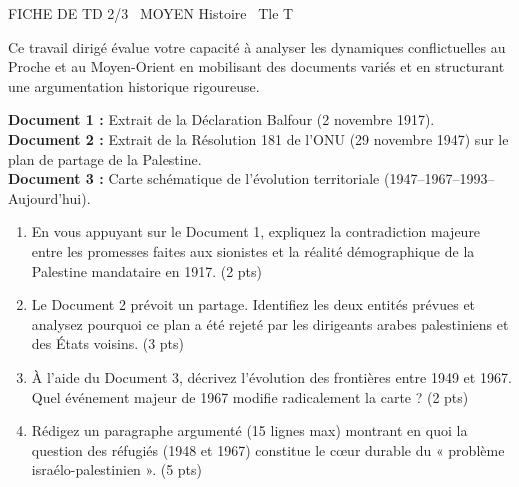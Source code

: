\documentclass[11pt]{article}
\begin{document}
\begin{tcolorbox}[enhanced,colback=popink,colframe=popink,arc=10pt,boxrule=0pt,left=12pt,right=12pt,top=9pt,bottom=9pt]
{\color{white}\popxbold\small FICHE DE TD 2/3 \textbullet\ MOYEN \hfill Histoire \textbullet\ Tle T\par}
\end{tcolorbox}
\vspace{4pt}
Ce travail dirigé évalue votre capacité à analyser les dynamiques conflictuelles au Proche et au Moyen-Orient en mobilisant des documents variés et en structurant une argumentation historique rigoureuse.

\begin{exercice}
\textbf{Document 1 :} Extrait de la Déclaration Balfour (2 novembre 1917). \\
\textbf{Document 2 :} Extrait de la Résolution 181 de l'ONU (29 novembre 1947) sur le plan de partage de la Palestine. \\
\textbf{Document 3 :} Carte schématique de l'évolution territoriale (1947--1967--1993--Aujourd'hui).

\begin{enumerate}
    \item En vous appuyant sur le Document 1, expliquez la contradiction majeure entre les promesses faites aux sionistes et la réalité démographique de la Palestine mandataire en 1917. (2 pts)
    \item Le Document 2 prévoit un partage. Identifiez les deux entités prévues et analysez pourquoi ce plan a été rejeté par les dirigeants arabes palestiniens et des États voisins. (3 pts)
    \item À l'aide du Document 3, décrivez l'évolution des frontières entre 1949 et 1967. Quel événement majeur de 1967 modifie radicalement la carte ? (2 pts)
    \item Rédigez un paragraphe argumenté (15 lignes max) montrant en quoi la question des réfugiés (1948 et 1967) constitue le cœur durable du « problème israélo-palestinien ». (5 pts)
\end{enumerate}
\end{exercice}
\end{document}
